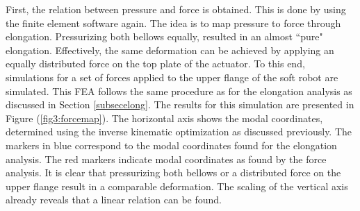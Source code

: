 First, the relation between pressure and force is obtained. This is done by using the finite element software again. The idea is to map pressure to force through elongation. Pressurizing both bellows equally, resulted in an almost ``pure" elongation. Effectively, the same deformation can be achieved by applying an equally distributed force on the top plate of the actuator. To this end, simulations for a set of forces applied to the upper flange of the soft robot are simulated. This FEA follows the same procedure as for the elongation analysis as discussed in Section \ref{subsecelong}. The results for this simulation are presented in Figure (\ref{fig3:forcemap}). The horizontal axis shows the modal coordinates, determined using the inverse kinematic optimization as discussed previously. The markers in blue correspond to the modal coordinates found for the elongation analysis. The red markers indicate modal coordinates as found by the force analysis. It is clear that pressurizing both bellows or a distributed force on the upper flange result in a comparable deformation. The scaling of the vertical axis already reveals that a linear relation can be found.


